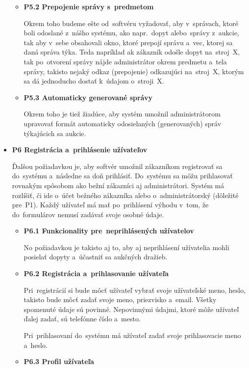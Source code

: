 \begin{itemize}
\begin{itemize}
\item \textbf{P5.2 Prepojenie správy s~predmetom}

Okrem toho budeme ešte od~softvéru vyžadovať, aby v~správach, ktoré boli odoslané z~nášho systému, ako napr.~dopyt alebo~správy z~aukcie, tak aby v~sebe obsahovali okno, ktoré prepojí správu a~vec, ktorej sa daná správa týka. Teda napríklad ak zákazník odošle dopyt na~stroj~X, tak po~otvorení správy nájde administrátor okrem predmetu a~tela správy, takisto nejaký odkaz (prepojenie) odkazujúci na~stroj~X, ktorým sa dá jednoducho dostať k~údajom o~stroji~X.

\item \textbf{P5.3 Automaticky generované správy}

Okrem toho je tiež žiadúce, aby systém umožnil administrátorom upravovať formát automaticky odosielaných (generovaných) správ týkajúcich sa aukcie.
\end{itemize}

\item \textbf{P6 Registrácia a~prihlásenie užívateľov}

Ďalšou požiadavkou je, aby softvér umožnil zákazníkom registrovať sa\\do~systému a~následne sa doň prihlásiť. Do~systému sa môžu prihlasovať rovnakým spôsobom ako bežní zákazníci aj administrátori. Systém má rozlíšiť, či ide o~účet bežného zákazníka alebo o~administrátorský (dôležité pre~P1). Každý užívateľ má mať po~prihlásení výhodu v~tom, že do~formulárov nemusí zadávať svoje osobné údaje.

\begin{itemize}
\item \textbf{P6.1 Funkcionality pre~neprihlásených užívatelov}

No požiadavkou je takisto aj to, aby aj neprihlásení užívatelia mohli posielať dopyty a~účastniť sa aukčných dražieb.

\item \textbf{P6.2 Registrácia a~prihlasovanie užívateľa}

Pri~registrácií si bude môcť užívateľ vybrať svoje užívateľské meno, heslo, takisto bude môcť zadať svoje meno, priezvisko a~email. Všetky spomenuté údaje sú povinné. Nepovinnými údajmi, ktoré môže užívateľ ďalej zadať, sú telefónne číslo a~mesto.

Pri~prihlasovaní do~systému má užívateľ zadať svoje prihlasovacie meno a~heslo.

\item \textbf{P6.3 Profil užívateľa}


\end{itemize}
\end{itemize}
